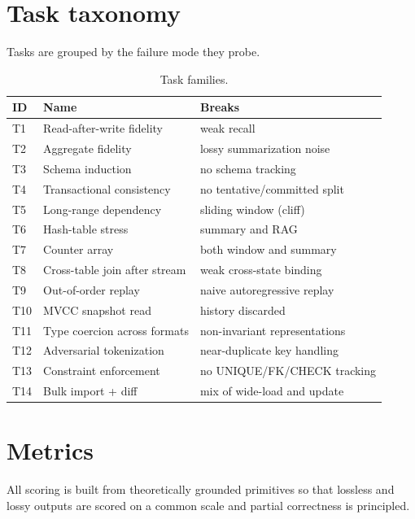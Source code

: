 \documentclass[11pt]{article}
\begin{document}
\section{Task taxonomy}
\label{sec:tasks}

Tasks are grouped by the failure mode they probe.

\begin{table}[h]
\centering
\small
\begin{tabularx}{\linewidth}{@{}l Y Y@{}}
\toprule
ID  & Name                          & Breaks                       \\
\midrule
T1  & Read-after-write fidelity     & weak recall                  \\
T2  & Aggregate fidelity            & lossy summarization noise    \\
T3  & Schema induction              & no schema tracking           \\
T4  & Transactional consistency     & no tentative/committed split \\
T5  & Long-range dependency         & sliding window (cliff)       \\
T6  & Hash-table stress             & summary and RAG              \\
T7  & Counter array                 & both window and summary      \\
T8  & Cross-table join after stream & weak cross-state binding     \\
T9  & Out-of-order replay           & naive autoregressive replay  \\
T10 & MVCC snapshot read            & history discarded            \\
T11 & Type coercion across formats  & non-invariant representations\\
T12 & Adversarial tokenization      & near-duplicate key handling  \\
T13 & Constraint enforcement        & no UNIQUE/FK/CHECK tracking  \\
T14 & Bulk import + diff            & mix of wide-load and update  \\
\bottomrule
\end{tabularx}
\caption{Task families.}
\end{table}

\section{Metrics}
\label{sec:metrics}

All scoring is built from theoretically grounded primitives so that
lossless and lossy outputs are scored on a common scale and partial
correctness is principled.
\end{document}
